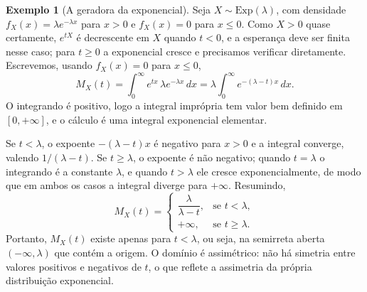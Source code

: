 \documentclass[12pt,portuguese]{article}
\theoremstyle{definition}
\newtheorem{example}[example]{Exemplo}
\theoremstyle{plainexercise}
\theoremstyle{starredexercise}
\theoremstyle{definition}
\begin{document}
\begin{example}[A geradora da exponencial]\label{ex:fgm-exponencial}
Seja $X\sim\mathrm{Exp}(\lambda)$, com densidade $f_X(x)=\lambda e^{-\lambda x}$
para $x>0$ e $f_X(x)=0$ para $x\leqslant 0$. Como $X>0$ quase certamente,
$e^{tX}$ é decrescente em $X$ quando $t<0$, e a esperança deve ser finita nesse
caso; para $t\geqslant 0$ a exponencial cresce e precisamos verificar
diretamente. Escrevemos, usando $f_X(x)=0$ para $x\leqslant 0$,
\[
M_X(t) = \int_0^{\infty} e^{tx}\,\lambda e^{-\lambda x}\,dx
= \lambda \int_0^{\infty} e^{-(\lambda-t)x}\,dx.
\]
O integrando é positivo, logo a integral imprópria tem valor bem definido em
$[0,+\infty]$, e o cálculo é uma integral exponencial elementar.

Se $t<\lambda$, o expoente $-(\lambda-t)x$ é negativo para $x>0$ e a integral
converge, valendo $1/(\lambda-t)$. Se $t\geqslant\lambda$, o expoente é não
negativo; quando $t=\lambda$ o integrando é a constante $\lambda$, e quando
$t>\lambda$ ele cresce exponencialmente, de modo que em ambos os casos a
integral diverge para $+\infty$. Resumindo,
\[
M_X(t) = \begin{cases}
\dfrac{\lambda}{\lambda - t}, & \text{se } t<\lambda, 
\\[0.6cm]
+\infty, & \text{se } t\geqslant\lambda.
\end{cases}
\]
Portanto, $M_X(t)$ existe apenas para $t<\lambda$, ou seja, na semirreta aberta
$(-\infty,\lambda)$ que contém a origem. O domínio é assimétrico: não há
simetria entre valores positivos e negativos de $t$, o que reflete a
assimetria da própria distribuição exponencial.
\end{example}
\end{document}
